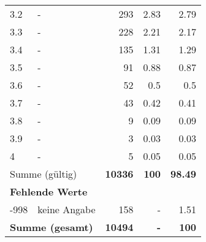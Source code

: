 \begin{longtable}{lXrrr}
        3.2 & \multicolumn{1}{X}{-} & %
          \num{293} &
          \num[round-mode=places,round-precision=2]{2.83} &
          \num[round-mode=places,round-precision=2]{2.79} \\

        3.3 & \multicolumn{1}{X}{-} & %
          \num{228} &
          \num[round-mode=places,round-precision=2]{2.21} &
          \num[round-mode=places,round-precision=2]{2.17} \\

        3.4 & \multicolumn{1}{X}{-} & %
          \num{135} &
          \num[round-mode=places,round-precision=2]{1.31} &
          \num[round-mode=places,round-precision=2]{1.29} \\

        3.5 & \multicolumn{1}{X}{-} & %
          \num{91} &
          \num[round-mode=places,round-precision=2]{0.88} &
          \num[round-mode=places,round-precision=2]{0.87} \\

        3.6 & \multicolumn{1}{X}{-} & %
          \num{52} &
          \num[round-mode=places,round-precision=2]{0.5} &
          \num[round-mode=places,round-precision=2]{0.5} \\

        3.7 & \multicolumn{1}{X}{-} & %
          \num{43} &
          \num[round-mode=places,round-precision=2]{0.42} &
          \num[round-mode=places,round-precision=2]{0.41} \\

        3.8 & \multicolumn{1}{X}{-} & %
          \num{9} &
          \num[round-mode=places,round-precision=2]{0.09} &
          \num[round-mode=places,round-precision=2]{0.09} \\

        3.9 & \multicolumn{1}{X}{-} & %
          \num{3} &
          \num[round-mode=places,round-precision=2]{0.03} &
          \num[round-mode=places,round-precision=2]{0.03} \\

        4 & \multicolumn{1}{X}{-} & %
          \num{5} &
          \num[round-mode=places,round-precision=2]{0.05} &
          \num[round-mode=places,round-precision=2]{0.05} \\

     \midrule
     \multicolumn{2}{l}{Summe (gültig)} &
       \textbf{\num{10336}} &
     \textbf{\num{100}} &
       \textbf{\num[round-mode=places,round-precision=2]{98.49}} \\
     \multicolumn{5}{l}{\textbf{Fehlende Werte}}\\
       -998 &
       keine Angabe &
         \num{158} &
        - &
         \num[round-mode=places,round-precision=2]{1.51} \\
     \midrule
     \multicolumn{2}{l}{\textbf{Summe (gesamt)}} &
          \textbf{\num{10494}} &
        \textbf{-} &
        \textbf{\num{100}} \\
     \bottomrule
     \end{longtable}
     
